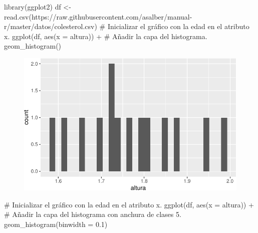 \documentclass[
  a4paper,
]{scrreport}
\newenvironment{Shaded}{\begin{snugshade}}{\end{snugshade}}
\newcommand{\AttributeTok}[1]{\textcolor[rgb]{0.40,0.45,0.13}{#1}}
\newcommand{\CommentTok}[1]{\textcolor[rgb]{0.37,0.37,0.37}{#1}}
\newcommand{\FloatTok}[1]{\textcolor[rgb]{0.68,0.00,0.00}{#1}}
\newcommand{\FunctionTok}[1]{\textcolor[rgb]{0.28,0.35,0.67}{#1}}
\newcommand{\NormalTok}[1]{\textcolor[rgb]{0.00,0.23,0.31}{#1}}
\newcommand{\OtherTok}[1]{\textcolor[rgb]{0.00,0.23,0.31}{#1}}
\newcommand{\SpecialCharTok}[1]{\textcolor[rgb]{0.37,0.37,0.37}{#1}}
\newcommand{\StringTok}[1]{\textcolor[rgb]{0.13,0.47,0.30}{#1}}
\theoremstyle{definition}
\theoremstyle{definition}
\theoremstyle{remark}
\begin{document}
\begin{Shaded}
\begin{Highlighting}[]
\FunctionTok{library}\NormalTok{(ggplot2)}
\NormalTok{df }\OtherTok{\textless{}{-}} \FunctionTok{read.csv}\NormalTok{(}\StringTok{\textquotesingle{}https://raw.githubusercontent.com/asalber/manual{-}r/master/datos/colesterol.csv\textquotesingle{}}\NormalTok{)}
\CommentTok{\# Inicializar el gráfico con la edad en el atributo x.}
\FunctionTok{ggplot}\NormalTok{(df, }\FunctionTok{aes}\NormalTok{(}\AttributeTok{x =}\NormalTok{ altura)) }\SpecialCharTok{+}
\CommentTok{\# Añadir la capa del histograma.}
    \FunctionTok{geom\_histogram}\NormalTok{()}
\end{Highlighting}
\end{Shaded}

\begin{figure}[H]

{\centering \includegraphics{07-graficos_files/figure-pdf/unnamed-chunk-15-1.pdf}

}

\end{figure}

\begin{Shaded}
\begin{Highlighting}[]
\CommentTok{\# Inicializar el gráfico con la edad en el atributo x.}
\FunctionTok{ggplot}\NormalTok{(df, }\FunctionTok{aes}\NormalTok{(}\AttributeTok{x =}\NormalTok{ altura)) }\SpecialCharTok{+}
\CommentTok{\# Añadir la capa del histograma con anchura de clases 5.}
    \FunctionTok{geom\_histogram}\NormalTok{(}\AttributeTok{binwidth =} \FloatTok{0.1}\NormalTok{)}
\end{Highlighting}
\end{Shaded}
\end{document}
